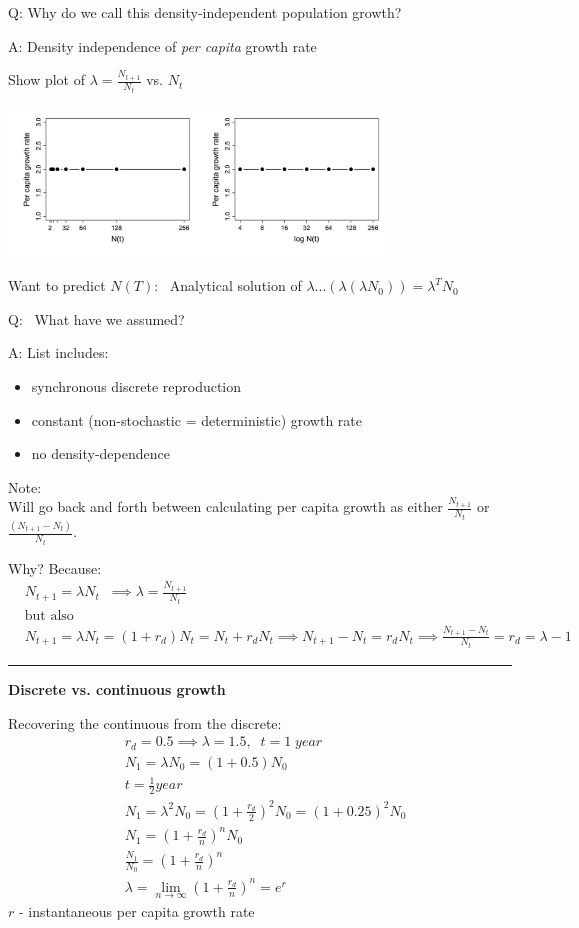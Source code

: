 \documentclass{article}
\newcommand{\note}[1]{\colorbox{gray!20}{#1}}
\newcommand*\circled[1]{\tikz[baseline=(char.base)]{
            \node[shape=circle,draw,inner sep=2pt] (char) {#1};}}
\begin{document}
\note{Q:} Why do we call this density-independent population growth? 

\note{A:} Density independence of \emph{per capita} growth rate

\note{Show plot of $\lambda=\frac{N_{t+1}}{N_t}$ vs. $N_t$}
\begin{center}
\includegraphics[width=10cm]{figs/image1}
\end{center}
Want to predict $N(T)$:  Analytical solution of $\lambda...(\lambda(\lambda N_0)) = \lambda^T N_0$


\note{Q:}  What have we assumed?

\note{A:}	List includes:
\begin{itemize}
	\item	synchronous discrete reproduction
	\item	constant (non-stochastic = deterministic) growth rate
	\item	no density-dependence
\end{itemize}

Note:\\
Will go back and forth between calculating per capita growth as either $\frac{N_{t+1}}{N_t}$ or $\frac{(N_{t+1}-N_t)}{N_t}$.

Why? Because:
\begin{align*}
& N_{t+1} =\lambda N_t \;\; 
\implies \lambda = \frac{N_{t+1}}{N_t}\\
& \text{but also}  \\ 
& N_{t+1}=\lambda N_t = (1+r_d)N_t = N_t + r_d N_t
\implies N_{t+1}-N_t = r_d N_t
\implies \frac{N_{t+1}-N_t}{N_t}=r_d = \lambda -1
\end{align*}

\rule[0.5ex]{\linewidth}{1pt}

\break

\circled{2}
\textbf{Discrete vs. continuous growth}

Recovering the continuous from the discrete:
\begin{align*}
	& r_d=0.5 \implies \lambda=1.5, \;\; t=1 \; year\\
	& N_1 = \lambda N_0=(1+0.5)N_0\\[1.5em]
	& t=\frac{1}{2} year \\
	& N_1 = \lambda^2 N_0 = \left(1+\tfrac{r_d}{2}\right)^2 N_0 = (1+0.25)^2 N_0 \\[1.5em]
	& N_1 = \left(1+\tfrac{r_d}{n}\right)^n N_0\\
	& \frac{N_1}{N_0}=\left(1+\tfrac{r_d}{n}\right)^n\\[1.5em]
	& \lambda = \lim_{n \to \infty}\left(1+\tfrac{r_d}{n}\right)^n = e^r 
\end{align*}
$r$ - instantaneous per capita growth rate
\end{document}
